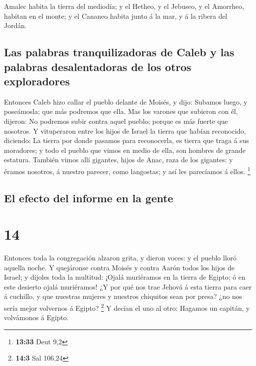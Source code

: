  Amalec habita la tierra del mediodía; y el Hetheo, y el
Jebuseo, y el Amorrheo, habitan en el monte; y el Cananeo habita junto á
la mar, y á la ribera del Jordán.

\hypertarget{las-palabras-tranquilizadoras-de-caleb-y-las-palabras-desalentadoras-de-los-otros-exploradores}{%
\subsection{Las palabras tranquilizadoras de Caleb y las palabras
desalentadoras de los otros
exploradores}\label{las-palabras-tranquilizadoras-de-caleb-y-las-palabras-desalentadoras-de-los-otros-exploradores}}

 Entonces Caleb hizo callar el pueblo delante de Moisés, y
dijo: Subamos luego, y poseámosla; que más podremos que ella.
 Mas los varones que subieron con él, dijeron: No podremos
subir contra aquel pueblo; porque es más fuerte que nosotros.
 Y vituperaron entre los hijos de Israel la tierra que
habían reconocido, diciendo: La tierra por donde pasamos para
reconocerla, es tierra que traga á sus moradores; y todo el pueblo que
vimos en medio de ella, son hombres de grande estatura. También vimos
allí gigantes, hijos de Anac, raza de los gigantes: y éramos nosotros, á
nuestro parecer, como langostas; y así les parecíamos á ellos.
\footnote{\textbf{13:33} Deut 9,2}

\hypertarget{el-efecto-del-informe-en-la-gente}{%
\subsection{El efecto del informe en la
gente}\label{el-efecto-del-informe-en-la-gente}}

\hypertarget{section-13}{%
\section{14}\label{section-13}}

 Entonces toda la congregación alzaron grita, y dieron
voces: y el pueblo lloró aquella noche.  Y quejáronse contra
Moisés y contra Aarón todos los hijos de Israel; y díjoles toda la
multitud: ¡Ojalá muriéramos en la tierra de Egipto; ó en este desierto
ojalá muriéramos!  ¿Y por qué nos trae Jehová á esta tierra
para caer á cuchillo, y que nuestras mujeres y nuestros chiquitos sean
por presa? ¿no nos sería mejor volvernos á Egipto? \footnote{\textbf{14:3}
  Sal 106,24}  Y decían el uno al otro: Hagamos un capitán,
y volvámonos á Egipto.


